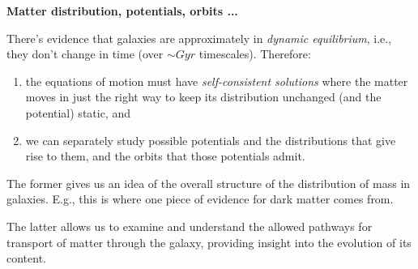 \documentclass[letterpaper,landscape]{slides}
\begin{document}

\begin{slide}
\begin{center}
\bfseries
{\large {\color{blue} Matter distribution, potentials, orbits ...} }
\end{center}

There's evidence that galaxies are approximately in {\em dynamic
equilibrium}, i.e., they don't change in time (over $\sim Gyr$ timescales).
Therefore:
%
\begin{enumerate}
   \item the equations of motion must have {\em self-consistent solutions} where the
matter moves in just the right way to keep its distribution unchanged (and
the potential) static, and
   \item we can separately study possible potentials and the distributions 
   that give rise to them, and the orbits that those potentials admit.
\end{enumerate}
%
The former gives us an idea of the overall structure of the distribution of
mass in galaxies. E.g., this is where one piece of evidence for dark matter
comes from.

The latter allows us to examine and understand the allowed pathways for transport
of matter through the galaxy, providing insight into the evolution of its
content.

\vfill
\end{slide}
 
\end{document}
